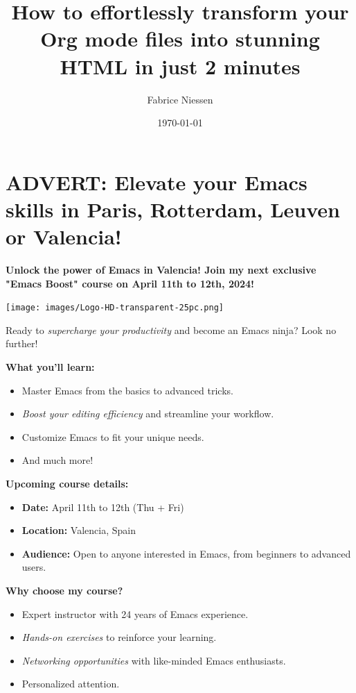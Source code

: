 \documentclass[11pt]{article}
\author{Fabrice Niessen}
\date{\today}
\title{How to effortlessly transform your Org mode files into stunning HTML in just 2 minutes}
\begin{document}
\maketitle
\tableofcontents


\section{ADVERT: Elevate your Emacs skills in Paris, Rotterdam, Leuven or Valencia!}
\label{sec:org342d1f8}

\textbf{Unlock the power of Emacs in Valencia!  Join my next exclusive "Emacs Boost"
course on April 11th to 12th, 2024!}

\begin{center}
\texttt{[image: images/Logo-HD-transparent-25pc.png]}
\end{center}

Ready to \emph{supercharge your productivity} and become an Emacs ninja?  Look no
further!

\textbf{What you'll learn:}
\begin{itemize}
\item Master Emacs from the basics to advanced tricks.
\item \emph{Boost your editing efficiency} and streamline your workflow.
\item Customize Emacs to fit your unique needs.
\item And much more!
\end{itemize}

\textbf{Upcoming course details:}
\begin{itemize}
\item \textbf{Date:} April 11th to 12th (Thu + Fri)
\item \textbf{Location:} Valencia, Spain
\item \textbf{Audience:} Open to anyone interested in Emacs, from beginners to advanced
users.
\end{itemize}

\textbf{Why choose my course?}
\begin{itemize}
\item Expert instructor with 24 years of Emacs experience.
\item \emph{Hands-on exercises} to reinforce your learning.
\item \emph{Networking opportunities} with like-minded Emacs enthusiasts.
\item Personalized attention.
\end{itemize}
\end{document}
